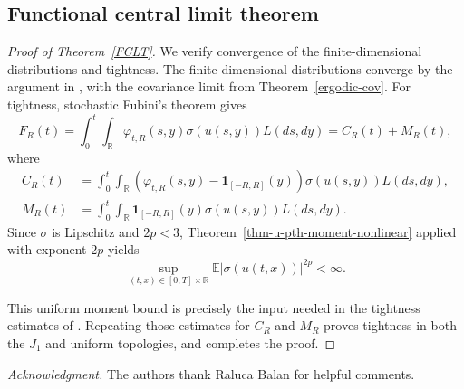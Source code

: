\documentclass[12pt]{article}
\def\bE{\mathbb{E}}
\def\bR{\mathbb{R}}
\begin{document}
\subsection{Functional central limit theorem}




\begin{proof}[ Proof of Theorem~\ref{FCLT}]
We verify convergence of the finite-dimensional distributions and
tightness. The finite-dimensional distributions converge by the argument in
\cite[proof of Theorem~1.3]{BLW26}, with the covariance limit from
Theorem~\ref{ergodic-cov}. For tightness, stochastic Fubini's theorem gives
\begin{equation}
\label{FR-decomp}
F_R(t)
=
\int_0^t\int_{\bR}
\varphi_{t,R}(s,y)\sigma(u(s,y))L(ds,dy)
=
C_R(t)+M_R(t),
\end{equation}
where
\begin{align*}
C_R(t)
&=
\int_0^t\int_{\bR}
\left(
\varphi_{t,R}(s,y)-\mathbf 1_{[-R,R]}(y)
\right)
\sigma(u(s,y))L(ds,dy), \\
M_R(t)
&=
\int_0^t\int_{\bR}
\mathbf 1_{[-R,R]}(y)
\sigma(u(s,y))L(ds,dy).
\end{align*}
Since \(\sigma\) is Lipschitz and \(2p<3\), Theorem~\ref{thm-u-pth-moment-nonlinear}
applied with exponent \(2p\) yields
\[
\sup_{(t,x)\in[0,T]\times\bR}
\bE|\sigma(u(t,x))|^{2p}<\infty .
\]

 This uniform moment bound is precisely the input needed in the
tightness estimates of \cite[proof of Theorem~1.3]{BLW26}. Repeating those
estimates for $C_R$ and $M_R$ proves tightness in both the $J_1$ and uniform
topologies, and completes the proof.
\end{proof}

\medskip

{\it Acknowledgment.}
 The authors thank Raluca Balan for helpful comments.




\end{document}
